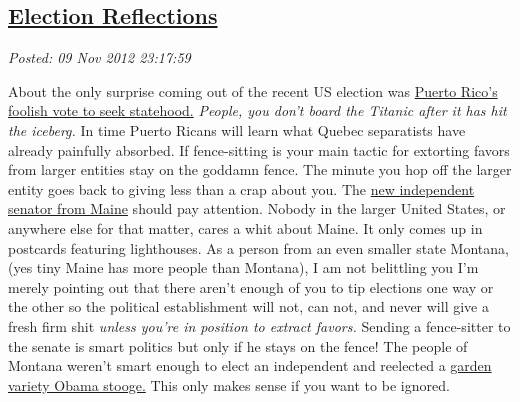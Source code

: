 %

\subsection*{\href{https://bakerjd99.wordpress.com/2012/11/09/election-reflections/}{Election Reflections}}


\noindent\emph{Posted: 09 Nov 2012 23:17:59}
\vspace{6pt}

About the only surprise coming out of the recent US election was
\href{http://www.guardian.co.uk/commentisfree/2012/nov/09/puerto-rico-vote-us-statehood}{Puerto
Rico's foolish vote to seek statehood.} \emph{People, you don't board
the Titanic after it has hit the iceberg.} In time Puerto Ricans will
learn what Quebec separatists have already painfully absorbed. If
fence-sitting is your main tactic for extorting favors from larger
entities stay on the goddamn fence. The minute you hop off the larger
entity goes back to giving less than a crap about you.
The \href{http://www.philly.com/philly/news/nation\_world/20121109\_Maine\_s\_senator-elect\_won\_t\_say\_which\_party\_he\_will\_back.html}{new
independent senator from Maine} should pay attention. Nobody in the
larger United States, or anywhere else for that matter, cares a whit
about Maine. It only comes up in postcards featuring lighthouses. As a
person from an even smaller state Montana, (yes tiny Maine has more
people than Montana), I am not belittling you I'm merely pointing out
that there aren't enough of you to tip elections one way or the other so
the political establishment will not, can not, and never will give a
fresh firm shit \emph{unless you're in position to extract favors.}
Sending a fence-sitter to the senate is smart politics but only if he
stays on the fence! The people of Montana weren't smart enough to elect
an independent and reelected a
\href{http://www.washingtonpost.com/blogs/the-fix/wp/2012/11/07/democrat-jon-tester-wins-reelection-in-montana-senate-race/}{garden
variety Obama stooge.} This only makes sense if you want to be ignored.

